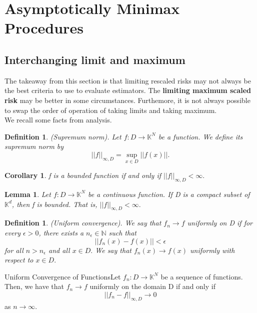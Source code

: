 \documentclass[twoside]{article}
\newtheorem{lemma}[theorem]{Lemma}
\newtheorem{corollary}[theorem]{Corollary}
\newtheorem{definition}[theorem]{Definition}
\begin{document}
\section{Asymptotically Minimax Procedures}
\subsection{Interchanging limit and maximum}
The takeaway from this section is that limiting rescaled risks may not always be the best criteria to use to evaluate estimators. The \textbf{limiting maximum scaled risk} may be better in some circumstances. Furthemore, it is not always possible to swap the order of operation of taking limits and taking maximum.\\

We recall some facts from analysis.
\begin{definition}(Supremum norm). Let $f: D \rightarrow \mathbb{K}^N$ be a function. We define its supremum norm by 
$$
||f||_{\infty,D} = \sup_{x \in D}||f(x)||.
$$
\end{definition}
\begin{corollary}f is a bounded function if and only if $||f||_{\infty,D} < \infty.$
\end{corollary}

\begin{lemma}Let $f: D \rightarrow \mathbb{K}^N$ be a continuous function. If D is a compact subset of $\mathbb{K}^d$, then f is bounded. That is, $||f||_{\infty,D} < \infty.$
\end{lemma}

\begin{definition}(Uniform convergence). We say that $f_n \rightarrow f$ uniformly on D if for every $\epsilon > 0$, there exists a $n_{\epsilon} \in \mathbb{N}$ such that 
$$
||f_n(x) - f(x)|| < \epsilon
$$
for all $n > n_{\epsilon}$ and all $x \in D.$ We say that $f_n(x) \rightarrow f(x)$ uniformly with respect to $x \in D.$
\end{definition}

\begin{proposition_exam}{Uniform Convergence of Functions}{}Let $f_n: D \rightarrow \mathbb{K}^N$ be a sequence of functions. Then, we have that $f_n \rightarrow f$ uniformly on the domain D if and only if 
$$
||f_n - f||_{\infty,D} \rightarrow 0
$$
as $n \rightarrow \infty.$
\end{proposition_exam}
\end{document}
